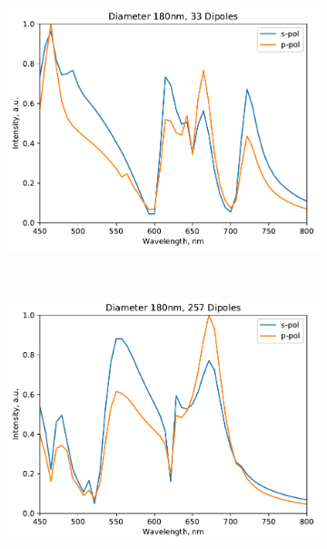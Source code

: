             \begin{figure}[!ht]
                \centering
                \begin{subfigure}[b]{0.3\textwidth}
                    \includegraphics[width=\textwidth]{figs/methods/DDA/n_33.pdf}
                    \caption{}
                \end{subfigure}~
                \begin{subfigure}[b]{0.3\textwidth}
                    \includegraphics[width=\textwidth]{figs/methods/DDA/n_257.pdf}
                    \caption{}
                \end{subfigure}~
                \begin{subfigure}[b]{0.3\textwidth}

\end{subfigure}
\end{figure}
